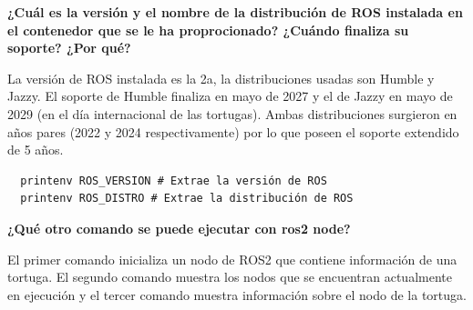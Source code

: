 \documentclass[a4paper,12pt]{article}
\newcommand{\vacio}{\textcolor{white}{ .}}
\begin{document}
{%

\renewcommand{\headrulewidth}{0.5pt}


\pagestyle{fancy}
\renewcommand{\footrulewidth}{0.5pt}
\fancyfoot[C]{\vacio}




\newpage

\textbf{¿Cuál es la versión y el nombre de la distribución de ROS instalada en el contenedor que se le ha proprocionado? 
¿Cuándo finaliza su soporte? ¿Por qué?}


\vspace{1cm}

La versión de ROS instalada es la 2a, la distribuciones usadas son Humble y Jazzy. El soporte de Humble finaliza en mayo de 2027 
y el de Jazzy en mayo de 2029 (en el día internacional de las tortugas). Ambas distribuciones surgieron en años pares (2022 y 2024 respectivamente)
por lo que poseen el soporte extendido de 5 años.

\vspace{0.5cm}

\begin{lstlisting}
  printenv ROS_VERSION # Extrae la versión de ROS
  printenv ROS_DISTRO # Extrae la distribución de ROS
\end{lstlisting}

\vspace{1cm}


\textbf{¿Qué otro comando se puede ejecutar con ros2 node?}


\vspace{1cm}

El primer comando inicializa un nodo de ROS2 que contiene información de una tortuga. El segundo comando 
muestra los nodos que se encuentran actualmente en ejecución y el tercer comando muestra información sobre el nodo de la tortuga.

}
\end{document}
